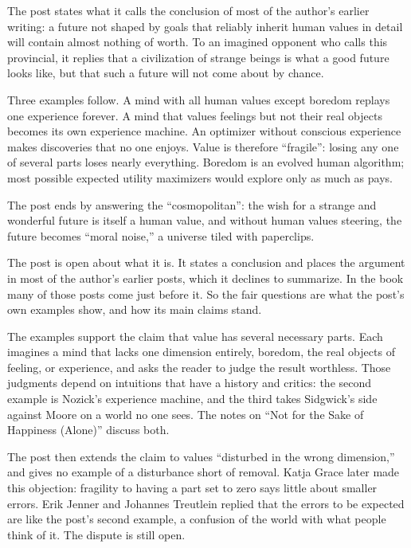 \begin{afterword}
\summaryhead

The post states what it calls the conclusion of most of the author's earlier writing: a future not shaped by goals that reliably inherit human values in detail will contain almost nothing of worth. To an imagined opponent who calls this provincial, it replies that a civilization of strange beings is what a good future looks like, but that such a future will not come about by chance.

Three examples follow. A mind with all human values except boredom replays one experience forever. A mind that values feelings but not their real objects becomes its own experience machine. An optimizer without conscious experience makes discoveries that no one enjoys. Value is therefore ``fragile'': losing any one of several parts loses nearly everything. Boredom is an evolved human algorithm; most possible expected utility maximizers would explore only as much as pays.

The post ends by answering the ``cosmopolitan'': the wish for a strange and wonderful future is itself a human value, and without human values steering, the future becomes ``moral noise,'' a universe tiled with paperclips.

\responsehead

The post is open about what it is. It states a conclusion and places the argument in most of the author's earlier posts, which it declines to summarize. In the book many of those posts come just before it. So the fair questions are what the post's own examples show, and how its main claims stand.

The examples support the claim that value has several necessary parts. Each imagines a mind that lacks one dimension entirely, boredom, the real objects of feeling, or experience, and asks the reader to judge the result worthless. Those judgments depend on intuitions that have a history and critics: the second example is Nozick's experience machine, and the third takes Sidgwick's side against Moore on a world no one sees. The notes on ``Not for the Sake of Happiness (Alone)'' discuss both.

The post then extends the claim to values ``disturbed in the wrong dimension,'' and gives no example of a disturbance short of removal. Katja Grace later made this objection: fragility to having a part set to zero says little about smaller errors. Erik Jenner and Johannes Treutlein replied that the errors to be expected are like the post's second example, a confusion of the world with what people think of it. The dispute is still open.


\end{afterword}
